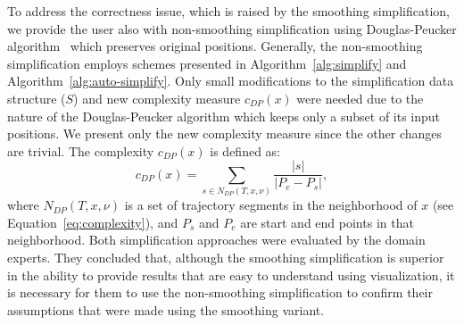 To address the correctness issue, which is raised by the smoothing simplification, we provide the user also with non-smoothing simplification using Douglas-Peucker algorithm~\cite{visvalingam1990douglas} which preserves original positions.
Generally, the non-smoothing simplification employs schemes presented in Algorithm~\ref{alg:simplify} and Algorithm~\ref{alg:auto-simplify}.
Only small modifications to the simplification data structure ($S$) and new complexity measure $c_{DP}(x)$ were needed due to the nature of the Douglas-Peucker algorithm which keeps only a subset of its input positions.
We present only the new complexity measure since the other changes are trivial.
The complexity $c_{DP}(x)$ is defined as:
\begin{equation}
  c_{DP}(x) = \sum_{s \in N_{DP}(T, x, \nu)}{\frac{|s|}{|P_e - P_s|}},
\label{eq:complexity-dp}
\end{equation}
where $N_{DP}(T, x, \nu)$ is a set of trajectory segments in the neighborhood of $x$ (see Equation~\ref{eq:complexity}), and $P_s$ and $P_e$ are start and end points in that neighborhood.
Both simplification approaches were evaluated by the domain experts.
They concluded that, although the smoothing simplification is superior in the ability to provide results that are easy to understand using visualization, it is necessary for them to use the non-smoothing simplification to confirm their assumptions that were made using the smoothing variant.
